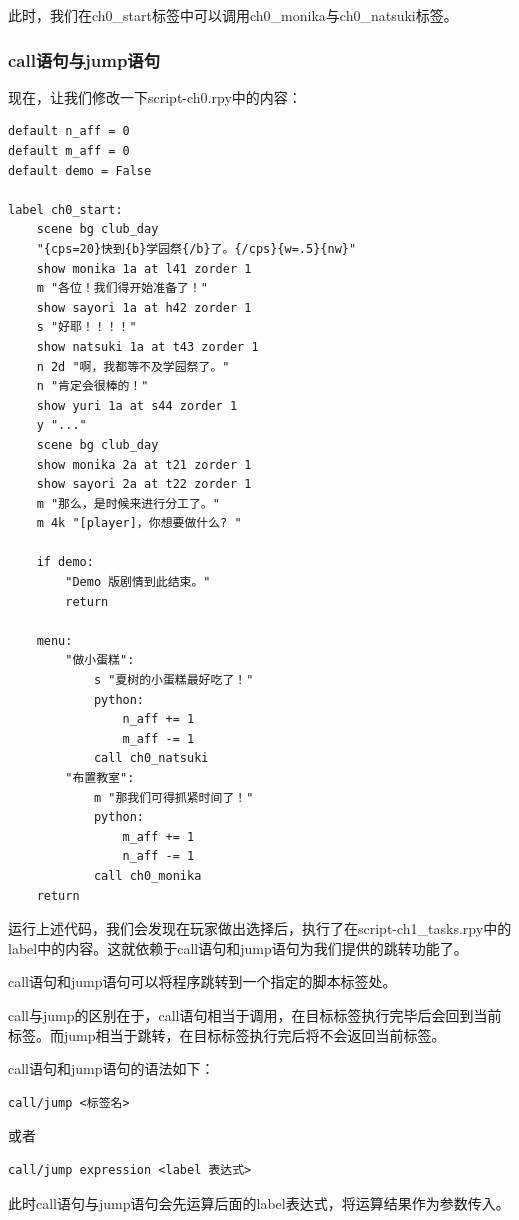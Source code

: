 \documentclass[../../Main.tex]{subfiles}
\begin{document}
此时，我们在ch0\_start标签中可以调用ch0\_monika与ch0\_natsuki标签。

\subsubsection{call语句与jump语句}

现在，让我们修改一下script-ch0.rpy中的内容：
\begin{lstlisting}[caption=script-ch0.rpy]
default n_aff = 0
default m_aff = 0
default demo = False

label ch0_start:
    scene bg club_day
    "{cps=20}快到{b}学园祭{/b}了。{/cps}{w=.5}{nw}"
    show monika 1a at l41 zorder 1
    m "各位！我们得开始准备了！"
    show sayori 1a at h42 zorder 1
    s "好耶！！！！"
    show natsuki 1a at t43 zorder 1
    n 2d "啊，我都等不及学园祭了。"
    n "肯定会很棒的！"
    show yuri 1a at s44 zorder 1
    y "..."
    scene bg club_day
    show monika 2a at t21 zorder 1
    show sayori 2a at t22 zorder 1
    m "那么，是时候来进行分工了。"
    m 4k "[player]，你想要做什么? "

    if demo:
        "Demo 版剧情到此结束。"
        return

    menu:
        "做小蛋糕":
            s "夏树的小蛋糕最好吃了！"
            python:
                n_aff += 1
                m_aff -= 1
            call ch0_natsuki
        "布置教室":
            m "那我们可得抓紧时间了！"
            python:
                m_aff += 1
                n_aff -= 1
            call ch0_monika
    return
\end{lstlisting}

运行上述代码，我们会发现在玩家做出选择后，执行了在script-ch1\_tasks.rpy中的label中的内容。这就依赖于call语句和jump语句为我们提供的跳转功能了。

call语句和jump语句可以将程序跳转到一个指定的脚本标签处。

call与jump的区别在于，call语句相当于调用，在目标标签执行完毕后会回到当前标签。而jump相当于跳转，在目标标签执行完后将不会返回当前标签。

call语句和jump语句的语法如下：
\begin{lstlisting}
call/jump <标签名>
\end{lstlisting}

或者

\begin{lstlisting}
call/jump expression <label 表达式>
\end{lstlisting}

此时call语句与jump语句会先运算后面的label表达式，将运算结果作为参数传入。
\end{document}
